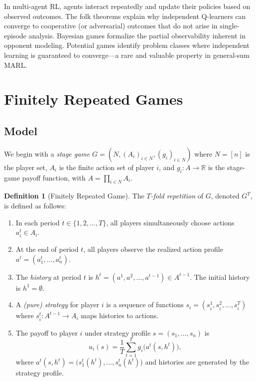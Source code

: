 \documentclass[11pt,a4paper]{article}
\theoremstyle{definition}
\newtheorem{definition}{Definition}[section]
\theoremstyle{plain}
\theoremstyle{remark}
\newcommand{\R}{\mathbb{R}}
\begin{document}
\begin{rlconnection}
In multi-agent RL, agents interact repeatedly and update their policies based on
observed outcomes. The folk theorems explain why independent Q-learners can converge to
cooperative (or adversarial) outcomes that do not arise in single-episode analysis.
Bayesian games formalize the partial observability inherent in opponent modeling.
Potential games identify problem classes where independent learning is guaranteed to
converge---a rare and valuable property in general-sum MARL.
\end{rlconnection}


\section{Finitely Repeated Games}
\label{sec:finitely-repeated}

\subsection{Model}

We begin with a \emph{stage game} $G = (N, (A_i)_{i \in N}, (g_i)_{i \in N})$ where
$N = [n]$ is the player set, $A_i$ is the finite action set of player $i$, and
$g_i : A \to \R$ is the stage-game payoff function, with $A = \prod_{i \in N} A_i$.

\begin{definition}[Finitely Repeated Game]
\label{def:finitely-repeated}
The \emph{$T$-fold repetition} of $G$, denoted $G^T$, is defined as follows:
\begin{enumerate}[label=(\alph*)]
    \item In each period $t \in \{1, 2, \ldots, T\}$, all players simultaneously choose
    actions $a_i^t \in A_i$.
    \item At the end of period $t$, all players observe the realized action profile
    $a^t = (a_1^t, \ldots, a_n^t)$.
    \item The \emph{history} at period $t$ is $h^t = (a^1, a^2, \ldots, a^{t-1}) \in A^{t-1}$.
    The initial history is $h^1 = \emptyset$.
    \item A \emph{(pure) strategy} for player $i$ is a sequence of functions
    $s_i = (s_i^1, s_i^2, \ldots, s_i^T)$ where $s_i^t : A^{t-1} \to A_i$ maps
    histories to actions.
    \item The payoff to player $i$ under strategy profile $s = (s_1, \ldots, s_n)$ is
    \[
        u_i(s) = \frac{1}{T} \sum_{t=1}^T g_i\bigl(a^t(s, h^t)\bigr),
    \]
    where $a^t(s, h^t) = \bigl(s_1^t(h^t), \ldots, s_n^t(h^t)\bigr)$ and histories are
    generated by the strategy profile.
\end{enumerate}
\end{definition}
\end{document}
